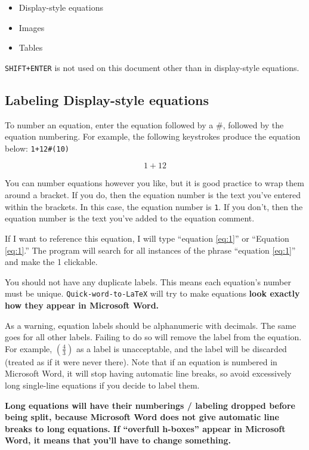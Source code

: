 \documentclass[12pt]{article}
\theoremstyle{plain}
\theoremstyle{remark}
\theoremstyle{definition}
\begin{document}
\begin{itemize}
\item
  Display-style equations
\item
  Images
\item
  Tables
\end{itemize}

\texttt{SHIFT+ENTER} is not used on this document other than in
display-style equations.


\subsection{Labeling Display-style
equations}

To number an equation, enter the equation followed by a \#, followed by
the equation numbering. For example, the following keystrokes produce
the equation below: \texttt{1+12\#(10)}


\begin{equation}
1 + 12 \tag{1}  \label{eq:1}
\end{equation}


You can number equations however you like, but it is good practice to
wrap them around a bracket. If you do, then the equation number is the
text you've entered within the brackets. In this case, the equation
number is \texttt{1}. If you don't, then the equation number is the text
you've added to the equation comment.

If I want to reference this equation, I will type ``equation \ref{eq:1}'' or
``Equation \ref{eq:1}.'' The program will search for all instances of the phrase
``equation \ref{eq:1}'' and make the 1 clickable.

You should not have any duplicate labels. This means each equation's
number must be unique. \texttt{Quick-word-to-LaTeX} will try to make
equations \textbf{look exactly how they appear in Microsoft Word.}

As a warning, equation labels should be alphanumeric with decimals. The
same goes for all other labels. Failing to do so will remove the label
from the equation. For example, \(\left( \frac{4}{3} \right)\) as a
label is unacceptable, and the label will be discarded (treated as if it
were never there). Note that if an equation is numbered in Microsoft
Word, it will stop having automatic line breaks, so avoid excessively
long single-line equations if you decide to label them.

\textbf{Long equations will have their numberings / labeling dropped
before being split, because Microsoft Word does not give automatic line
breaks to long equations. If ``overfull h-boxes'' appear in Microsoft
Word, it means that you'll have to change something.}
\end{document}
